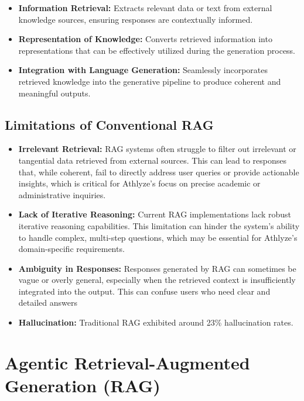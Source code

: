 \documentclass[conference]{IEEEtran}
\begin{document}
\begin{itemize}
\item \textbf{Information Retrieval:} Extracts relevant data or text from external knowledge sources, ensuring responses are contextually informed.
\item \textbf{Representation of Knowledge:} Converts retrieved information into representations that can be effectively utilized during the generation process.
\item \textbf{Integration with Language Generation:} Seamlessly incorporates retrieved knowledge into the generative pipeline to produce coherent and meaningful outputs.
\end{itemize}

\subsection{Limitations of Conventional RAG}

\begin{itemize}
\item \textbf{Irrelevant Retrieval:} RAG systems often struggle to filter out irrelevant or tangential data retrieved from external sources. This can lead to responses that, while coherent, fail to directly address user queries or provide actionable insights, which is critical for Athlyze's focus on precise academic or administrative inquiries.
\item \textbf{Lack of Iterative Reasoning:} Current RAG implementations lack robust iterative reasoning capabilities. This limitation can hinder the system's ability to handle complex, multi-step questions, which may be essential for Athlyze's domain-specific requirements.
\item \textbf{Ambiguity in Responses:} Responses generated by RAG can sometimes be vague or overly general, especially when the retrieved context is insufficiently integrated into the output. This can confuse users who need clear and detailed answers
\item \textbf{Hallucination:} Traditional RAG exhibited around 23\% hallucination rates.\\

\end{itemize}

\section{Agentic Retrieval-Augmented Generation (RAG)}
\end{document}
